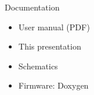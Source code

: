 %
%
%
%
%

%
%
%
%
%


\begin{frame}{Documentation}

    \begin{itemize}
        \item User manual (PDF)
        \vspace{0.4cm}
        \item This presentation
        \vspace{0.4cm}
        \item Schematics
        \vspace{0.4cm}
        \item Firmware: Doxygen
    \end{itemize}

\end{frame}
